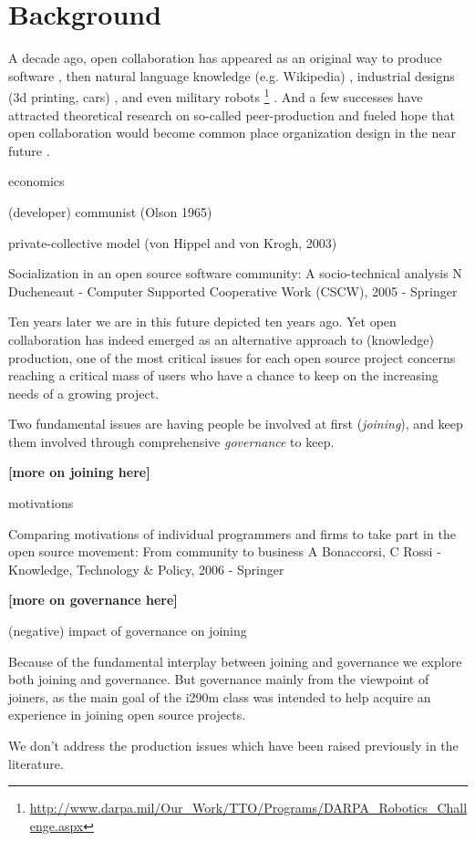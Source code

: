 \section{Background}

A decade ago, open collaboration has appeared as an original way to produce software \cite{}, then natural language knowledge (e.g. Wikipedia) , industrial designs (3d printing, cars) \cite{pearce2012}, and even military robots \footnote{\url{http://www.darpa.mil/Our_Work/TTO/Programs/DARPA_Robotics_Challenge.aspx}} . And a few successes have attracted theoretical research on so-called peer-production and fueled hope that open collaboration would become common place organization design in the near future \cite{benkler2002}. 

economics \cite{lerner2002}

(developer) communist (Olson 1965)

private-collective model (von Hippel and von Krogh, 2003)


Socialization in an open source software community: A socio-technical analysis
N Ducheneaut - Computer Supported Cooperative Work (CSCW), 2005 - Springer




Ten years later we are in this future depicted ten years ago. Yet open collaboration has indeed emerged as an alternative approach to (knowledge) production, one of the most critical issues for each open source project concerns reaching a critical mass of users who have a chance to keep on the increasing needs of a growing project. 

Two fundamental issues are having people be involved at first ({\it joining}), and keep them involved through comprehensive {\it governance} to keep.

{\bf [more on joining here]}

motivations

Comparing motivations of individual programmers and firms to take part in the open source movement: From community to business
A Bonaccorsi, C Rossi - Knowledge, Technology & Policy, 2006 - Springer


{\bf [more on governance here]} 

 \cite{O'Mahony2007}

(negative) impact of governance on joining \cite{halfacker2013}

Because of the fundamental interplay between joining and governance we explore both joining and governance. But governance mainly from the viewpoint of joiners, as the main goal of the i290m class was intended to help acquire an experience in joining open source projects.

We don't address the production issues which have been raised previously in the literature.


